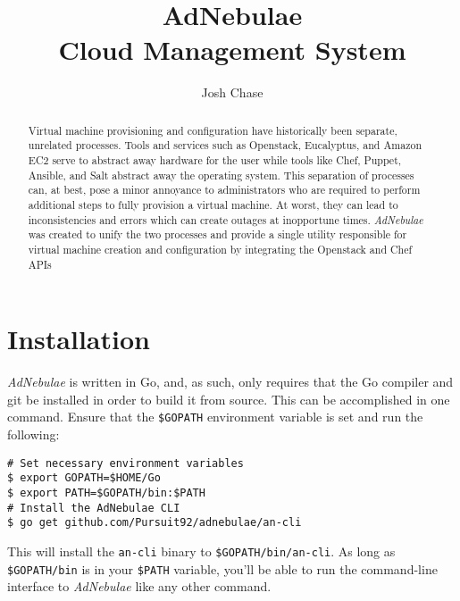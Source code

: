 \documentclass[11pt]{article}
\title{\textbf{AdNebulae}\\Cloud Management System}
\author{Josh Chase}
\begin{document}
\maketitle
\pagebreak

\newcommand\aN{\textit{AdNebulae} }
\newcommand\GOPATH{\$GOPATH}
\newcommand\PATH{\$PATH}
\newcommand\HOME{\$HOME}

\begin{abstract}
    Virtual machine provisioning and configuration have historically
    been separate, unrelated processes. Tools and services such as
    Openstack, Eucalyptus, and Amazon EC2 serve to abstract away
    hardware for the user while tools like Chef, Puppet, Ansible, and
    Salt abstract away the operating system. This separation of
    processes can, at best, pose a minor annoyance to administrators who
    are required to perform additional steps to fully provision a
    virtual machine. At worst, they can lead to inconsistencies and
    errors which can create outages at inopportune times. \aN was
    created to unify the two processes and provide a single utility
    responsible for virtual machine creation and configuration by
    integrating the Openstack and Chef APIs
\end{abstract}

\begin{tableofcontents}
\end{tableofcontents}

\pagebreak

\section{Installation}

\aN is written in Go, and, as such, only requires that the Go compiler
and git be installed in order to build it from source. This can be
accomplished in one command. Ensure that the \texttt{\GOPATH}
environment variable is set and run the following:

\begin{lstlisting}
# Set necessary environment variables
$ export GOPATH=$HOME/Go
$ export PATH=$GOPATH/bin:$PATH
# Install the AdNebulae CLI
$ go get github.com/Pursuit92/adnebulae/an-cli
\end{lstlisting}

This will install the \texttt{an-cli} binary to
\texttt{\GOPATH/bin/an-cli}. As long as \texttt{\GOPATH/bin} is in your
\texttt{\PATH} variable, you'll be able to run the command-line
interface to \aN like any other command.
\end{document}

